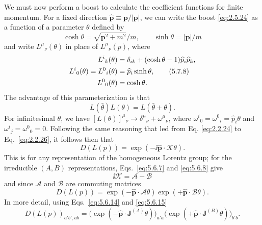 We must now perform a boost to calculate the coefficient functions for finite
momentum. For a fixed direction $\widehat{\mathbf p}\equiv
\mathbf p/|\mathbf p|$, we can write the boost \eqref{eq:2.5.24} as a function of a
parameter $\theta$ defined by
\begin{equation}
\cosh\theta=\sqrt{\mathbf p^2+m^2}/m,
\qquad \sinh\theta=|\mathbf p|/m
\tag{5.7.7}\label{eq:5.7.7}
\end{equation}
and write $L^\mu{}_\nu(\theta)$ in place of $L^\mu{}_\nu(p)$, where
\begin{align}
L^i{}_k(\theta)&=\delta_{ik}+(\cosh\theta-1)\widehat p_i\widehat p_k,
\notag\\
L^i{}_0(\theta)=L^0{}_i(\theta)&=\widehat p_i\sinh\theta,
\tag{5.7.8}\label{eq:5.7.8}\\
L^0{}_0(\theta)&=\cosh\theta.
\notag
\end{align}
The advantage of this parameterization is that
\begin{equation}
L(\bar\theta)L(\theta)=L(\bar\theta+\theta).
\tag{5.7.9}\label{eq:5.7.9}
\end{equation}
For infinitesimal $\theta$, we have
$[L(\theta)]^\mu{}_\nu\to\delta^\mu{}_\nu+\omega^\mu{}_\nu$, where
$\omega^i{}_0=\omega^0{}_i=\widehat p_i\theta$ and
$\omega^i{}_j=\omega^0{}_0=0$. Following the same reasoning that led from Eq.
\eqref{eq:2.2.24} to Eq.~\eqref{eq:2.2.26}, it follows then that
\begin{equation}
D(L(p))=\exp(-\ii\widehat{\mathbf p}\cdot\boldsymbol{\mathcal K}\theta).
\tag{5.7.10}\label{eq:5.7.10}
\end{equation}
This is for any representation of the homogeneous Lorentz group; for the
irreducible $(A,B)$ representations, Eqs.~\eqref{eq:5.6.7} and \eqref{eq:5.6.8} give
\begin{equation}
\ii\boldsymbol{\mathcal K}=\boldsymbol{\mathcal A}-\boldsymbol{\mathcal B}
\tag{5.7.11}\label{eq:5.7.11}
\end{equation}
and since $\boldsymbol{\mathcal A}$ and $\boldsymbol{\mathcal B}$ are commuting
matrices
\begin{equation}
D(L(p))=\exp(-\widehat{\mathbf p}\cdot\boldsymbol{\mathcal A}\theta)
\exp(+\widehat{\mathbf p}\cdot\boldsymbol{\mathcal B}\theta).
\tag{5.7.12}\label{eq:5.7.12}
\end{equation}
In more detail, using Eqs.~\eqref{eq:5.6.14} and \eqref{eq:5.6.15}
\begin{equation}
D(L(p))_{a'b',ab}=
\bigl(\exp(-\widehat{\mathbf p}\cdot\mathbf J^{(A)}\theta)\bigr)_{a'a}
\bigl(\exp(+\widehat{\mathbf p}\cdot\mathbf J^{(B)}\theta)\bigr)_{b'b}.
\tag{5.7.13}\label{eq:5.7.13}
\end{equation}
